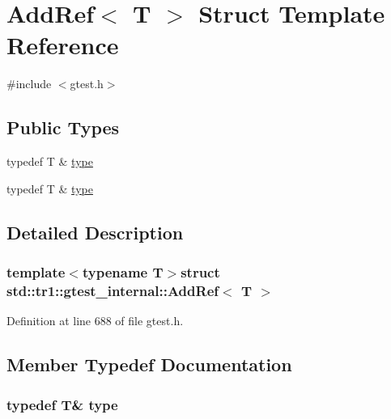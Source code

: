 \hypertarget{structstd_1_1tr1_1_1gtest__internal_1_1AddRef}{\section{\-Add\-Ref$<$ \-T $>$ \-Struct \-Template \-Reference}
\label{d8/db3/structstd_1_1tr1_1_1gtest__internal_1_1AddRef}
}


{\ttfamily \#include $<$gtest.\-h$>$}

\subsection*{\-Public \-Types}
\begin{DoxyCompactItemize}
\item 
typedef \-T \& \hyperlink{structstd_1_1tr1_1_1gtest__internal_1_1AddRef_a08e05528fbb401bd8299a21d67d13ee3}{type}
\item 
typedef \-T \& \hyperlink{structstd_1_1tr1_1_1gtest__internal_1_1AddRef_a08e05528fbb401bd8299a21d67d13ee3}{type}
\end{DoxyCompactItemize}


\subsection{\-Detailed \-Description}
\subsubsection*{template$<$typename T$>$struct std\-::tr1\-::gtest\-\_\-internal\-::\-Add\-Ref$<$ T $>$}



\-Definition at line 688 of file gtest.\-h.



\subsection{\-Member \-Typedef \-Documentation}
\hypertarget{structstd_1_1tr1_1_1gtest__internal_1_1AddRef_a08e05528fbb401bd8299a21d67d13ee3}{
\subsubsection[{type}]{\setlength{\rightskip}{0pt plus 5cm}typedef \-T\& {\bf type}}}\label{d8/db3/structstd_1_1tr1_1_1gtest__internal_1_1AddRef_a08e05528fbb401bd8299a21d67d13ee3}


